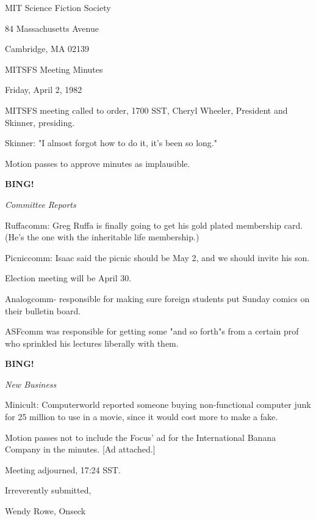 \documentclass[12pt]{article}
\newcommand{\bing}{{\bf BING!} }
\newcommand{\goto}[1]{\bing \vskip 12pt \centerline{{\em{#1}}}}
\begin{document}
\begin{center}

MIT Science Fiction Society 

84 Massachusetts Avenue

Cambridge, MA 02139

\vspace{12pt}

MITSFS Meeting Minutes 

Friday, April 2, 1982

\end{center}
 
\vspace{18pt}

\setlength{\parskip}{6pt}

\noindent
MITSFS meeting called to order, 1700 SST,
Cheryl Wheeler, President and Skinner, presiding.

Skinner: "I almost forgot how to do it, it's been so long."

Motion passes to approve minutes as implausible.

\goto{Committee Reports}

Ruffacomm: Greg Ruffa is finally going to get his gold plated membership card. (He's the one with the inheritable life membership.)

Picniccomm: Isaac said the picnic should be May 2, and we should invite his son.

Election meeting will be April 30.

Analogcomm- responsible for making sure foreign students put Sunday comics on their bulletin board.

ASFcomm was responsible for getting some "and so forth"s from a certain prof who sprinkled his lectures liberally with them.

\goto{New Business}

Minicult: Computerworld reported someone buying non-functional computer junk for 25 million to use in a movie, since it would cost more to make a fake.

Motion passes not to include the Focus' ad for the International Banana Company in the minutes. [Ad attached.]

\vspace{12pt}

\noindent
Meeting adjourned, 17:24 SST.

\vspace{18pt}

\centerline{Irreverently submitted,}
\centerline{Wendy Rowe, Onseck}
\end{document}
